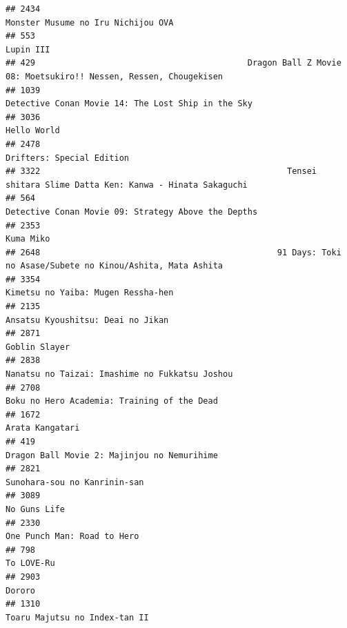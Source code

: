 \documentclass[
]{article}
\begin{document}
\begin{verbatim}
## 2434                                                                        Monster Musume no Iru Nichijou OVA
## 553                                                                                                  Lupin III
## 429                                           Dragon Ball Z Movie 08: Moetsukiro!! Nessen, Ressen, Chougekisen
## 1039                                                        Detective Conan Movie 14: The Lost Ship in the Sky
## 3036                                                                                               Hello World
## 2478                                                                                 Drifters: Special Edition
## 3322                                                  Tensei shitara Slime Datta Ken: Kanwa - Hinata Sakaguchi
## 564                                                        Detective Conan Movie 09: Strategy Above the Depths
## 2353                                                                                                 Kuma Miko
## 2648                                                91 Days: Toki no Asase/Subete no Kinou/Ashita, Mata Ashita
## 3354                                                                        Kimetsu no Yaiba: Mugen Ressha-hen
## 2135                                                                         Ansatsu Kyoushitsu: Deai no Jikan
## 2871                                                                                             Goblin Slayer
## 2838                                                            Nanatsu no Taizai: Imashime no Fukkatsu Joshou
## 2708                                                               Boku no Hero Academia: Training of the Dead
## 1672                                                                                           Arata Kangatari
## 419                                                                Dragon Ball Movie 2: Majinjou no Nemurihime
## 2821                                                                              Sunohara-sou no Kanrinin-san
## 3089                                                                                              No Guns Life
## 2330                                                                               One Punch Man: Road to Hero
## 798                                                                                                 To LOVE-Ru
## 2903                                                                                                    Dororo
## 1310                                                                             Toaru Majutsu no Index-tan II

\end{verbatim}
\end{document}
